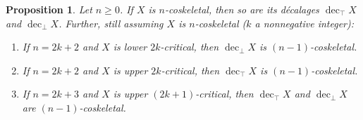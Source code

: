 \documentclass{amsart}
\newcommand{\decbot}{\operatorname{dec}_\bot}
\newcommand{\dectop}{\operatorname{dec}_\top}
\newtheorem{proposition}[theorem]{Proposition}
\theoremstyle{definition}
\theoremstyle{remark}
\begin{document}
\begin{proposition}\label{prop coskel to dec coskel}
Let $n\geq 0$.
If $X$ is $n$-coskeletal, then so are its d\'ecalages $\dectop X$ and $\decbot X$.
Further, still assuming $X$ is $n$-coskeletal ($k$ a nonnegative integer):
\begin{enumerate}
\item If $n=2k+2$ and $X$ is lower $2k$-critical, 
then $\decbot X$ is $(n{-}1)$-coskeletal.
\item If $n=2k+2$ and $X$ is upper $2k$-critical, 
then $\dectop X$ is $(n{-}1)$-coskeletal.\label{item upev}
\item If $n=2k+3$ and $X$ is upper $(2k{+}1)$-critical,
then $\dectop X$ and $\decbot X$ are $(n{-}1)$-coskeletal. \label{item upod}
\end{enumerate}
\end{proposition}
\end{document}
